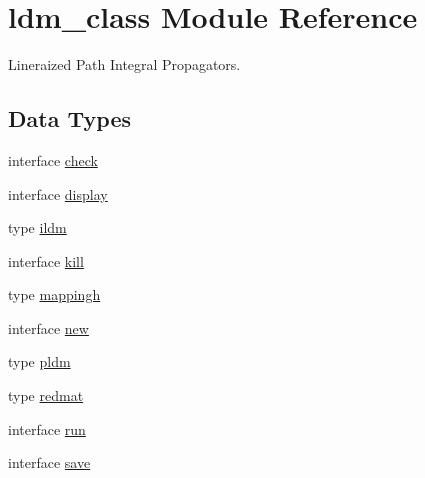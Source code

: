 \hypertarget{classldm__class}{\section{ldm\+\_\+class Module Reference}
\label{classldm__class}
}


Lineraized Path Integral Propagators.  


\subsection*{Data Types}
\begin{DoxyCompactItemize}
\item 
interface \hyperlink{interfaceldm__class_1_1check}{check}
\item 
interface \hyperlink{interfaceldm__class_1_1display}{display}
\item 
type \hyperlink{structldm__class_1_1ildm}{ildm}
\item 
interface \hyperlink{interfaceldm__class_1_1kill}{kill}
\item 
type \hyperlink{structldm__class_1_1mappingh}{mappingh}
\item 
interface \hyperlink{interfaceldm__class_1_1new}{new}
\item 
type \hyperlink{structldm__class_1_1pldm}{pldm}
\item 
type \hyperlink{structldm__class_1_1redmat}{redmat}
\item 
interface \hyperlink{interfaceldm__class_1_1run}{run}
\item 
interface \hyperlink{interfaceldm__class_1_1save}{save}
\end{DoxyCompactItemize}
